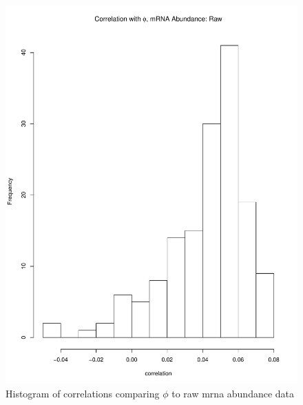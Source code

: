 \documentclass[11pt]{labbook}
\begin{document}
\begin{figure}[H]
\centering
\includegraphics[page=1,scale=0.6]{Ecoli_REL606/correlation_ppr_mrna_raw.pdf}
\caption{Histogram of correlations comparing $\phi$ to raw mrna abundance data}
\end{figure}
\end{document}
